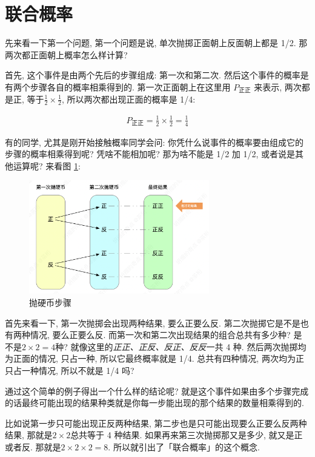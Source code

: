 \section{联合概率}

先来看一下第一个问题, 第一个问题是说, 单次抛掷正面朝上反面朝上都是 1/2. 那两次都正面朝上概率怎么样计算? 

首先, 这个事件是由两个先后的步骤组成: 第一次和第二次. 然后这个事件的概率是有两个步骤各自的概率相乘得到的. 第一次正面朝上在这里用 $P_{\mbox{正正}}$ 来表示, 两次都是正, 等于$\frac{1}{2} \times \frac{1}{2}$, 所以两次都出现正面的概率是 1/4: 

\begin{align*}
  P_{\mbox{正正}} = \frac{1}{2} \times \frac{1}{2} = \frac{1}{4}
\end{align*}

有的同学, 尤其是刚开始接触概率同学会问: 你凭什么说事件的概率要由组成它的步骤的概率相乘得到呢? 凭啥不能相加呢? 那为啥不能是 1/2 加 1/2, 或者说是其他运算呢? 来看图 \ref{fig:img5_2}:

\begin{figure}[ht]
  \centering
  \includegraphics[width=0.7\textwidth]{asset/bd947955-687e-49b7-a430-c6921cd49504.png}
  \caption{抛硬币步骤}
  \label{fig:img5_2}
\end{figure}

首先来看一下, 第一次抛掷会出现两种结果, 要么正要么反. 第二次抛掷它是不是也有两种情况, 要么正要么反. 而第一次和第二次出现结果的组合总共有多少种? 是不是$2 \times 2 = 4$种? 就像这里的\textit{正正、正反、反正、反反}一共 4 种. 然后两次抛掷均为正面的情况, 只占一种, 所以它最终概率就是 1/4. 总共有四种情况, 两次均为正只占一种情况, 所以不就是 1/4 吗? 

通过这个简单的例子得出一个什么样的结论呢? 就是这个事件如果由多个步骤完成的话最终可能出现的结果种类就是你每一步能出现的那个结果的数量相乘得到的. 

比如说第一步只可能出现正反两种结果, 第二步也是只可能出现要么正要么反两种结果, 那就是$2\times 2$总共等于 4 种结果. 如果再来第三次抛掷那又是多少, 就又是正或者反. 那就是$2\times 2\times 2=8$. 所以就引出了「联合概率」的这个概念. 

